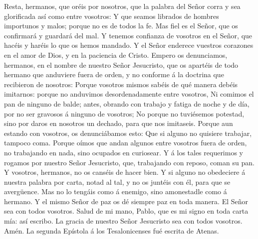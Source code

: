  Resta, hermanos, que oréis por nosotros, que la palabra del
Señor corra y sea glorificada así como entre vosotros:  Y
que seamos librados de hombres importunos y malos; porque no es de todos
la fe.  Mas fiel es el Señor, que os confirmará y guardará
del mal.  Y tenemos confianza de vosotros en el Señor, que
hacéis y haréis lo que os hemos mandado.  Y el Señor
enderece vuestros corazones en el amor de Dios, y en la paciencia de
Cristo.  Empero os denunciamos, hermanos, en el nombre de
nuestro Señor Jesucristo, que os apartéis de todo hermano que anduviere
fuera de orden, y no conforme á la doctrina que recibieron de nosotros:
 Porque vosotros mismos sabéis de qué manera debéis
imitarnos: porque no anduvimos desordenadamente entre vosotros,
 Ni comimos el pan de ninguno de balde; antes, obrando con
trabajo y fatiga de noche y de día, por no ser gravosos á ninguno de
vosotros;  No porque no tuviésemos potestad, sino por daros
en nosotros un dechado, para que nos imitaseis.  Porque aun
estando con vosotros, os denunciábamos esto: Que si alguno no quisiere
trabajar, tampoco coma.  Porque oímos que andan algunos
entre vosotros fuera de orden, no trabajando en nada, sino ocupados en
curiosear.  Y á los tales requerimos y rogamos por nuestro
Señor Jesucristo, que, trabajando con reposo, coman su pan.
 Y vosotros, hermanos, no os canséis de hacer bien.
 Y si alguno no obedeciere á nuestra palabra por carta,
notad al tal, y no os juntéis con él, para que se avergüence.
 Mas no lo tengáis como á enemigo, sino amonestadle como á
hermano.  Y el mismo Señor de paz os dé siempre paz en toda
manera. El Señor sea con todos vosotros.  Salud de mi mano,
Pablo, que es mi signo en toda carta mía: así escribo.  La
gracia de nuestro Señor Jesucristo sea con todos vosotros. Amén. La
segunda Epístola á los Tesalonicenses fué escrita de Atenas.

